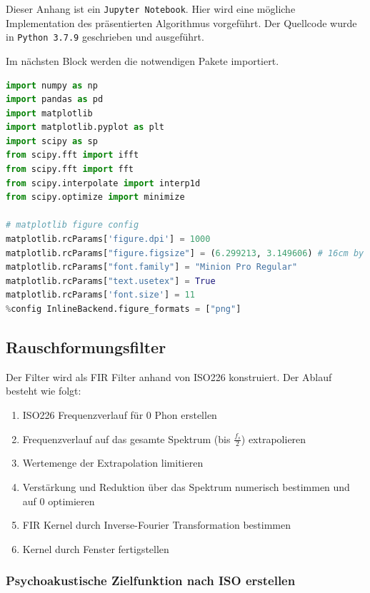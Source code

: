 Dieser Anhang ist ein \texttt{Jupyter Notebook}. Hier wird eine mögliche
Implementation des präsentierten Algorithmus vorgeführt. Der Quellcode
wurde in \texttt{Python 3.7.9} geschrieben und ausgeführt.

Im nächsten Block werden die notwendigen Pakete importiert.

\begin{lstlisting}[language=Python]
import numpy as np
import pandas as pd
import matplotlib
import matplotlib.pyplot as plt
import scipy as sp
from scipy.fft import ifft
from scipy.fft import fft
from scipy.interpolate import interp1d
from scipy.optimize import minimize

# matplotlib figure config
matplotlib.rcParams['figure.dpi'] = 1000
matplotlib.rcParams["figure.figsize"] = (6.299213, 3.149606) # 16cm by 8cm
matplotlib.rcParams["font.family"] = "Minion Pro Regular"
matplotlib.rcParams["text.usetex"] = True
matplotlib.rcParams['font.size'] = 11
%config InlineBackend.figure_formats = ["png"]
\end{lstlisting}

\hypertarget{rauschformungsfilter}{%
\subsection{Rauschformungsfilter}\label{rauschformungsfilter}}

Der Filter wird als FIR Filter anhand von ISO226 konstruiert. Der Ablauf
besteht wie folgt:

\begin{enumerate}
\tightlist
\item
  ISO226 Frequenzverlauf für 0 Phon erstellen
\item
  Frequenzverlauf auf das gesamte Spektrum (bis \(\frac{f_s}{2}\))
  extrapolieren
\item
  Wertemenge der Extrapolation limitieren
\item
  Verstärkung und Reduktion über das Spektrum numerisch bestimmen und
  auf 0 optimieren
\item
  FIR Kernel durch Inverse-Fourier Transformation bestimmen
\item
  Kernel durch Fenster fertigstellen
\end{enumerate}

\hypertarget{psychoakustische-zielfunktion-nach-iso-erstellen}{%
\subsubsection{Psychoakustische Zielfunktion nach ISO
erstellen}\label{psychoakustische-zielfunktion-nach-iso-erstellen}}

